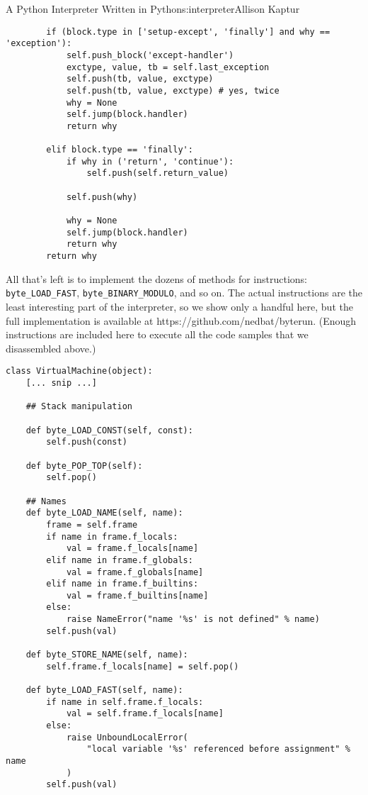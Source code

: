 \begin{aosachapter}{A Python Interpreter Written in Python}{s:interpreter}{Allison Kaptur}
\begin{verbatim}
        if (block.type in ['setup-except', 'finally'] and why == 'exception'):
            self.push_block('except-handler')
            exctype, value, tb = self.last_exception
            self.push(tb, value, exctype)
            self.push(tb, value, exctype) # yes, twice
            why = None
            self.jump(block.handler)
            return why

        elif block.type == 'finally':
            if why in ('return', 'continue'):
                self.push(self.return_value)

            self.push(why)

            why = None
            self.jump(block.handler)
            return why
        return why
\end{verbatim}

\label{the-instructions}

All that's left is to implement the dozens of methods for instructions:
\texttt{byte\_LOAD\_FAST}, \texttt{byte\_BINARY\_MODULO}, and so on. The
actual instructions are the least interesting part of the interpreter,
so we show only a handful here, but the full implementation is available
at https://github.com/nedbat/byterun. (Enough instructions are included
here to execute all the code samples that we disassembled above.)

\begin{verbatim}
class VirtualMachine(object):
    [... snip ...]

    ## Stack manipulation

    def byte_LOAD_CONST(self, const):
        self.push(const)

    def byte_POP_TOP(self):
        self.pop()

    ## Names
    def byte_LOAD_NAME(self, name):
        frame = self.frame
        if name in frame.f_locals:
            val = frame.f_locals[name]
        elif name in frame.f_globals:
            val = frame.f_globals[name]
        elif name in frame.f_builtins:
            val = frame.f_builtins[name]
        else:
            raise NameError("name '%s' is not defined" % name)
        self.push(val)

    def byte_STORE_NAME(self, name):
        self.frame.f_locals[name] = self.pop()

    def byte_LOAD_FAST(self, name):
        if name in self.frame.f_locals:
            val = self.frame.f_locals[name]
        else:
            raise UnboundLocalError(
                "local variable '%s' referenced before assignment" % name
            )
        self.push(val)


\end{verbatim}
\end{aosachapter}
